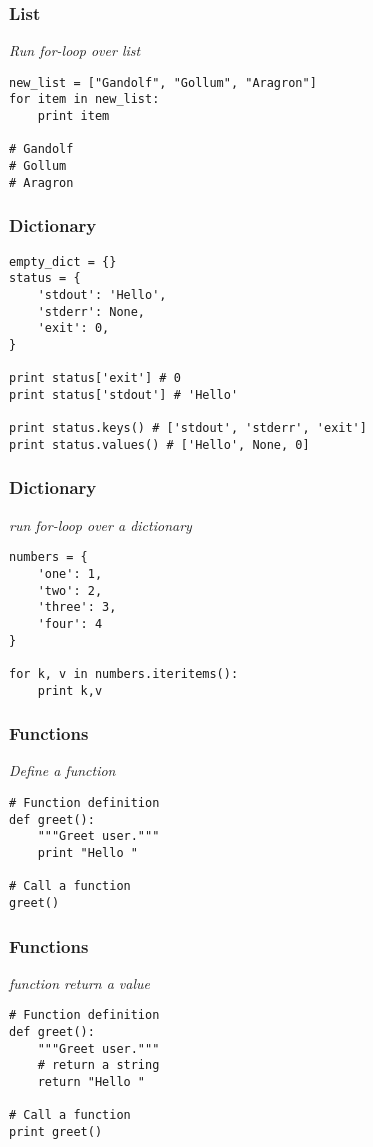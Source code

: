 \documentclass[bigger, presentation]{beamer}
\begin{document}
\begin{frame}[fragile]
\frametitle{List}
\label{sec-2-6}

   \emph{Run for-loop over list}


\begin{verbatim}
new_list = ["Gandolf", "Gollum", "Aragron"]
for item in new_list:
    print item

# Gandolf
# Gollum
# Aragron
\end{verbatim}
\end{frame}
\begin{frame}[fragile]
\frametitle{Dictionary}
\label{sec-2-7}



\begin{verbatim}
empty_dict = {}
status = {
    'stdout': 'Hello',
    'stderr': None,
    'exit': 0,
}

print status['exit'] # 0
print status['stdout'] # 'Hello'

print status.keys() # ['stdout', 'stderr', 'exit']
print status.values() # ['Hello', None, 0]
\end{verbatim}
\end{frame}
\begin{frame}[fragile]
\frametitle{Dictionary}
\label{sec-2-8}

   \emph{run for-loop over a dictionary}

\begin{verbatim}
numbers = {
    'one': 1,
    'two': 2,
    'three': 3,
    'four': 4
}

for k, v in numbers.iteritems():
    print k,v
\end{verbatim}
\end{frame}
\begin{frame}[fragile]
\frametitle{Functions}
\label{sec-2-9}

   \emph{Define a function}


\begin{verbatim}
# Function definition
def greet():
    """Greet user."""
    print "Hello "

# Call a function
greet()
\end{verbatim}
\end{frame}
\begin{frame}[fragile]
\frametitle{Functions}
\label{sec-2-10}

   \emph{function return a value}


\begin{verbatim}
# Function definition
def greet():
    """Greet user."""
    # return a string
    return "Hello "

# Call a function
print greet()
\end{verbatim}
\end{frame}
\end{document}

